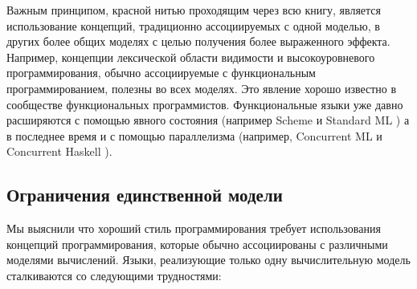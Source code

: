 Важным принципом, красной нитью проходящим через всю книгу, является использование концепций, традиционно ассоциируемых с одной моделью, в других более общих моделях с целью получения более выраженного эффекта. Например, концепции лексической области видимости и высокоуровневого программирования, обычно ассоциируемые с функциональным программированием, полезны во всех моделях. Это явление хорошо известно в сообществе функциональных программистов. Функциональные языки уже давно расширяются с помощью явного состояния (например Scheme \cite{38} и Standard ML \cite{126, 192}) а в последнее время и с помощью параллелизма (например, Concurrent ML \cite{158} и Concurrent Haskell \cite{149, 147}).

\subsection*{Ограничения единственной модели}

Мы выяснили что хороший стиль программирования требует использования концепций программирования, которые обычно ассоциированы с различными моделями вычислений. Языки, реализующие только одну вычислительную модель сталкиваются со следующими трудностями:

